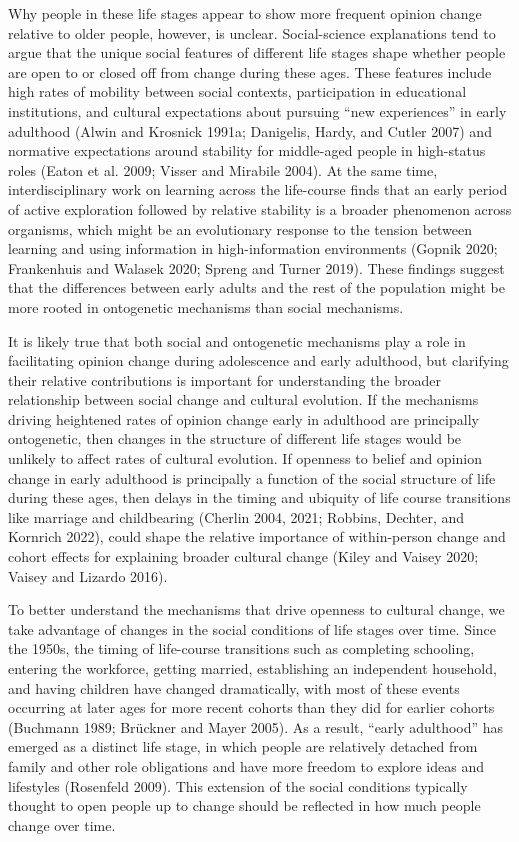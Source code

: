 \documentclass[
  12pt,
]{article}
\begin{document}
Why people in these life stages appear to show more frequent opinion change relative to older people, however, is unclear. Social-science explanations tend to argue that the unique social features of different life stages shape whether people are open to or closed off from change during these ages. These features include high rates of mobility between social contexts, participation in educational institutions, and cultural expectations about pursuing ``new experiences'' in early adulthood (Alwin and Krosnick 1991a; Danigelis, Hardy, and Cutler 2007) and normative expectations around stability for middle-aged people in high-status roles (Eaton et al. 2009; Visser and Mirabile 2004). At the same time, interdisciplinary work on learning across the life-course finds that an early period of active exploration followed by relative stability is a broader phenomenon across organisms, which might be an evolutionary response to the tension between learning and using information in high-information environments (Gopnik 2020; Frankenhuis and Walasek 2020; Spreng and Turner 2019). These findings suggest that the differences between early adults and the rest of the population might be more rooted in ontogenetic mechanisms than social mechanisms.

It is likely true that both social and ontogenetic mechanisms play a role in facilitating opinion change during adolescence and early adulthood, but clarifying their relative contributions is important for understanding the broader relationship between social change and cultural evolution. If the mechanisms driving heightened rates of opinion change early in adulthood are principally ontogenetic, then changes in the structure of different life stages would be unlikely to affect rates of cultural evolution. If openness to belief and opinion change in early adulthood is principally a function of the social structure of life during these ages, then delays in the timing and ubiquity of life course transitions like marriage and childbearing (Cherlin 2004, 2021; Robbins, Dechter, and Kornrich 2022), could shape the relative importance of within-person change and cohort effects for explaining broader cultural change (Kiley and Vaisey 2020; Vaisey and Lizardo 2016).

To better understand the mechanisms that drive openness to cultural change, we take advantage of changes in the social conditions of life stages over time. Since the 1950s, the timing of life-course transitions such as completing schooling, entering the workforce, getting married, establishing an independent household, and having children have changed dramatically, with most of these events occurring at later ages for more recent cohorts than they did for earlier cohorts (Buchmann 1989; Brückner and Mayer 2005). As a result, ``early adulthood'' has emerged as a distinct life stage, in which people are relatively detached from family and other role obligations and have more freedom to explore ideas and lifestyles (Rosenfeld 2009). This extension of the social conditions typically thought to open people up to change should be reflected in how much people change over time.
\end{document}
